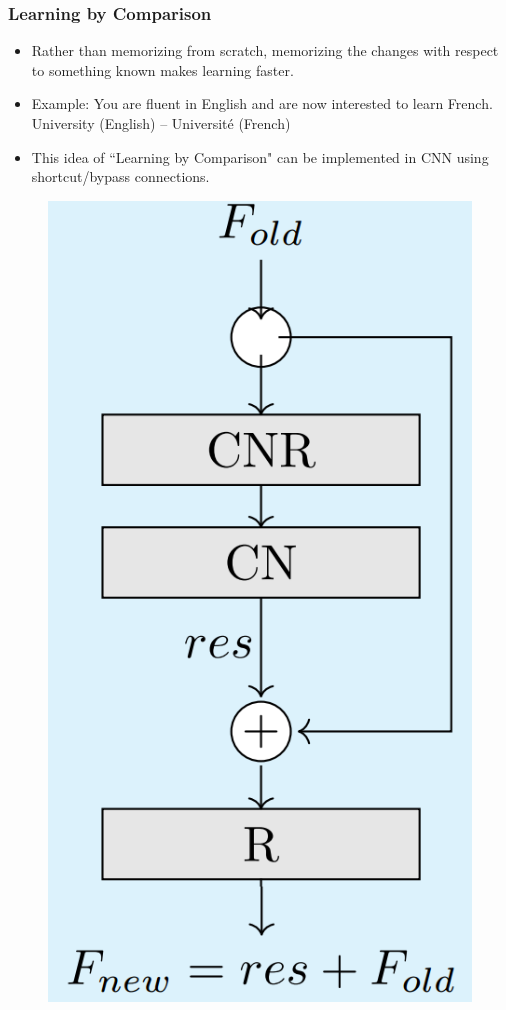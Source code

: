 \documentclass[9pt]{beamer}
\begin{document}
\begin{frame}
	\frametitle{Learning by Comparison}
	\begin{itemize}
		\item Rather than memorizing from scratch, memorizing the changes with respect to something known makes learning faster.	
		\item Example: You are fluent in English and are now interested to learn French. \\
		\hspace{2em} University (English) -- Universit\'e (French)
		\pause
		\item This idea of ``Learning by Comparison" can be implemented in CNN using shortcut/bypass connections.
	\end{itemize}
	\begin{figure}
		\includegraphics[scale=0.15]{./figures/edit/residual.png}
	\end{figure}
\end{frame}
\end{document}
